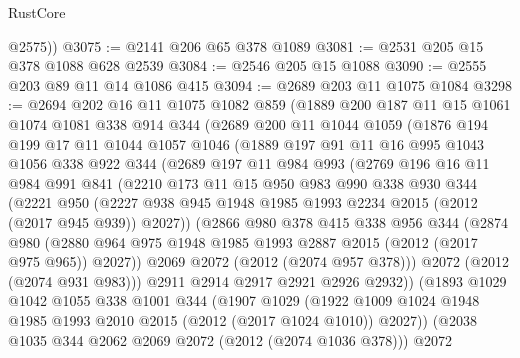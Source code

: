\begin{lexlean}{RustCore}
\begin{coremodule}
        @2575))
@3075 := @2141 @206 @65 @378 @1089
@3081 := @2531 @205 @15 @378 @1088 @628 @2539
@3084 := @2546 @205 @15 @1088
@3090 := @2555 @203 @89 @11 @14 @1086 @415
@3094 := @2689 @203 @11 @1075 @1084
@3298 := @2694
    @202
    @16
    @11
    @1075
    @1082
    @859
    (@1889
      @200
      @187
      @11
      @15
      @1061
      @1074
      @1081
      @338
      @914
      @344
      (@2689
        @200
        @11
        @1044
        @1059
        (@1876
          @194
          @199
          @17
          @11
          @1044
          @1057
          @1046
          (@1889
            @197
            @91
            @11
            @16
            @995
            @1043
            @1056
            @338
            @922
            @344
            (@2689
              @197
              @11
              @984
              @993
              (@2769
                @196
                @16
                @11
                @984
                @991
                @841
                (@2210
                  @173
                  @11
                  @15
                  @950
                  @983
                  @990
                  @338
                  @930
                  @344
                  (@2221
                    @950
                    (@2227 @938 @945 @1948 @1985 @1993 @2234 @2015 (@2012 (@2017 @945 @939)) @2027))
                  (@2866
                    @980
                    @378
                    @415
                    @338
                    @956
                    @344
                    (@2874
                      @980
                      (@2880
                        @964
                        @975
                        @1948
                        @1985
                        @1993
                        @2887
                        @2015
                        (@2012 (@2017 @975 @965))
                        @2027))
                    @2069
                    @2072
                    (@2012 (@2074 @957 @378)))
                  @2072
                  (@2012 (@2074 @931 @983)))
                @2911
                @2914
                @2917
                @2921
                @2926
                @2932))
            (@1893
              @1029
              @1042
              @1055
              @338
              @1001
              @344
              (@1907
                @1029
                (@1922 @1009 @1024 @1948 @1985 @1993 @2010 @2015 (@2012 (@2017 @1024 @1010)) @2027))
              (@2038 @1035 @344 @2062 @2069 @2072 (@2012 (@2074 @1036 @378)))
              @2072

\end{coremodule}
\end{lexlean}
